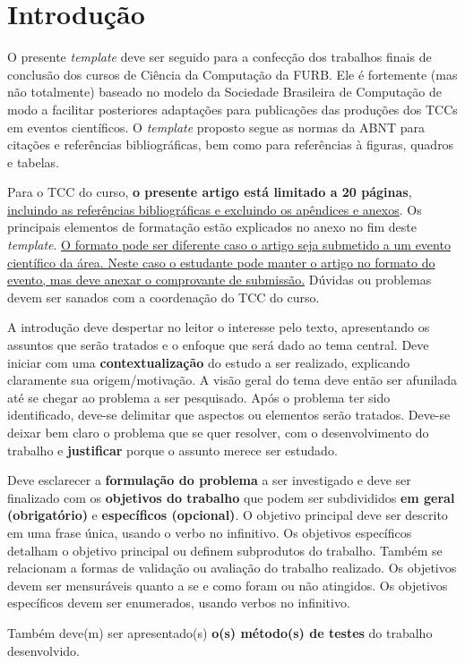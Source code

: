 \section{Introdução}\label{sec:introducao}

O presente \emph{template} deve ser seguido para a confecção dos trabalhos
finais de conclusão dos cursos de Ciência da Computação da FURB. Ele é
fortemente (mas não totalmente) baseado no modelo da Sociedade Brasileira de
Computação de modo a facilitar posteriores adaptações para publicações das
produções dos TCCs em eventos científicos. O \emph{template} proposto segue as
normas da ABNT para citações e referências bibliográficas, bem como para
referências à figuras, quadros e tabelas.

Para o TCC do curso, \textbf{o presente artigo está limitado a 20
páginas}, \ul{incluindo as referências bibliográficas e excluindo os
apêndices e anexos}. Os principais elementos de formatação estão
explicados no anexo no fim deste \emph{template}. \ul{O formato pode ser
diferente caso o artigo seja submetido a um evento científico da área.
Neste caso o estudante pode manter o artigo no formato do evento, mas
deve anexar o comprovante de submissão.} Dúvidas ou problemas devem ser
sanados com a coordenação do TCC do curso.

A introdução deve despertar no leitor o interesse pelo texto,
apresentando os assuntos que serão tratados e o enfoque que será dado ao
tema central. Deve iniciar com uma \textbf{contextualização} do estudo a
ser realizado, explicando claramente sua origem/motivação. A visão geral
do tema deve então ser afunilada até se chegar ao problema a ser
pesquisado. Após o problema ter sido identificado, deve-se delimitar que
aspectos ou elementos serão tratados. Deve-se deixar bem claro o
problema que se quer resolver, com o desenvolvimento do trabalho e
\textbf{justificar} porque o assunto merece ser estudado.

Deve esclarecer a \textbf{formulação do problema} a ser investigado e
deve ser finalizado com os \textbf{objetivos do trabalho} que podem ser
subdivididos \textbf{em geral (obrigatório)} e \textbf{específicos
(opcional)}. O objetivo principal deve ser descrito em uma frase única,
usando o verbo no infinitivo. Os objetivos específicos detalham o
objetivo principal ou definem subprodutos do trabalho. Também se
relacionam a formas de validação ou avaliação do trabalho realizado. Os
objetivos devem ser mensuráveis quanto a se e como foram ou não
atingidos. Os objetivos específicos devem ser enumerados, usando verbos
no infinitivo.

Também deve(m) ser apresentado(s) \textbf{o(s) método(s) de testes} do
trabalho desenvolvido.
